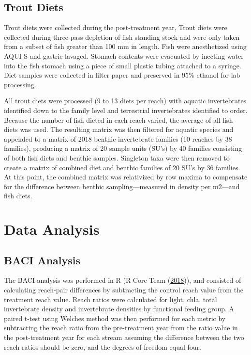 \documentclass[double,12pt]{beavtex}
\begin{document}
  \subsection*{Trout Diets}\label{trout-diets}
  
  Trout diets were collected during the post-treatment year, Trout diets
  were collected during three-pass depletion of fish standing stock and
  were only taken from a subset of fish greater than 100 mm in length.
  Fish were anesthetized using AQUI-S and gastric lavaged. Stomach
  contents were evacuated by inecting water into the fish stomach using a
  piece of small plastic tubing attached to a syringe. Diet samples were
  collected in filter paper and preserved in 95\% ethanol for lab
  processing.
  
  All trout diets were processed (9 to 13 diets per reach) with aquatic
  invertebrates identified down to the family level and terrestrial
  invertebrates identified to order. Because the number of fish dieted in
  each reach varied, the average of all fish diets was used. The resulting
  matrix was then filtered for aquatic species and appended to a matrix of
  2018 benthic invertebrate families (10 reaches by 38 families),
  producing a matrix of 20 sample units (SU's) by 40 families consisting
  of both fish diets and benthic samples. Singleton taxa were then removed
  to create a matrix of combined diet and benthic families of 20 SU's by
  36 families. At this point, the combined matrix was relativized by row
  maxima to compensate for the difference between benthic
  sampling---measured in density per m2---and fish diets.
  
  \section*{Data Analysis}\label{data-analysis}
  
  \subsection*{BACI Analysis}\label{baci-analysis}
  
  The BACI analysis was performed in R (R Core Team
  (\protect\hyperlink{ref-R-base}{2018})), and consisted of calculating
  reach-pair differences by subtracting the control reach value from the
  treatment reach value. Reach ratios were calculated for light, chla,
  total invertebrate density and invertebrate densities by functional
  feeding group. A paired t-test using Welches method was then performed
  for each metric by subtracting the reach ratio from the pre-treatment
  year from the ratio value in the post-treatment year for each stream
  assuming the difference between the two reach ratios should be zero, and
  the degrees of freedom equal four.
  
\end{document}
